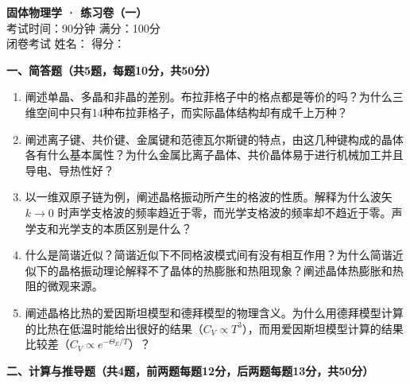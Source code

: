 \documentclass[12pt,a4paper,fontset=mac]{ctexart}
\newcommand{\shortanswer}{\vspace{5cm}}
\begin{document}
\begin{center}
{\LARGE \textbf{固体物理学 · 练习卷（一）}}\\[0.5em]
{\large 考试时间：90分钟 \quad 满分：100分}\\[0.3em]
{\normalsize 闭卷考试 \quad 姓名：\underline{\hspace{3cm}} \quad 得分：\underline{\hspace{2cm}}}
\end{center}

\vspace{0.5em}

\noindent\textbf{一、简答题（共5题，每题10分，共50分）}

\begin{enumerate}
\item 阐述单晶、多晶和非晶的差别。布拉菲格子中的格点都是等价的吗？为什么三维空间中只有14种布拉菲格子，而实际晶体结构却有成千上万种？
\shortanswer

\item 阐述离子键、共价键、金属键和范德瓦尔斯键的特点，由这几种键构成的晶体各有什么基本属性？为什么金属比离子晶体、共价晶体易于进行机械加工并且导电、导热性好？
\shortanswer

\item 以一维双原子链为例，阐述晶格振动所产生的格波的性质。解释为什么波矢 $k \to 0$ 时声学支格波的频率趋近于零，而光学支格波的频率却不趋近于零。声学支和光学支的本质区别是什么？
\shortanswer

\item 什么是简谐近似？简谐近似下不同格波模式间有没有相互作用？为什么简谐近似下的晶格振动理论解释不了晶体的热膨胀和热阻现象？阐述晶体热膨胀和热阻的微观来源。
\shortanswer

\item 阐述晶格比热的爱因斯坦模型和德拜模型的物理含义。为什么用德拜模型计算的比热在低温时能给出很好的结果（$C_V \propto T^3$），而用爱因斯坦模型计算的结果比较差（$C_V \propto e^{-\Theta_E/T}$）？
\shortanswer

\end{enumerate}

\newpage

\noindent\textbf{二、计算与推导题（共4题，前两题每题12分，后两题每题13分，共50分）}
\end{document}
